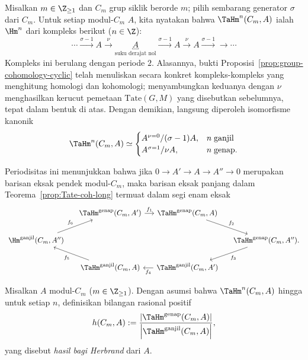 \begin{example}\label{eg:TaHm-periodic}
	Misalkan $m\in\Z_{\geq1}$ dan $C_m$ grup siklik berorde $m$; pilih sembarang
	generator $\sigma$ dari $C_m$. Untuk setiap modul-$C_m$ $A$, kita nyatakan
	bahwa $\TaHm^n(C_m,A)$ ialah $\Hm^n$ dari kompleks berikut
	($n\in\Z$):
	\[ \cdots \xrightarrow{\sigma-1} A \xrightarrow{\nu} \underbracket{A}_{\text{suku derajat nol}} \xrightarrow{\sigma-1} A \xrightarrow{\nu} A \xrightarrow{\sigma-1} \to \cdots \]
	Kompleks ini berulang dengan periode $2$. Alasannya, bukti
	Proposisi~\ref{prop:group-cohomology-cyclic} telah menuliskan secara konkret
	kompleks-kompleks yang menghitung homologi dan kohomologi; menyambungkan
	keduanya dengan $\nu$ menghasilkan kerucut pemetaan
	$\mathrm{Tate}(G,M)$ yang disebutkan sebelumnya, tepat dalam bentuk di
	atas. Dengan demikian, langsung diperoleh isomorfisme kanonik
	\[ \TaHm^n(C_m, A) \simeq \begin{cases}
		A^{\nu=0} / (\sigma-1) A, & n\;\text{ganjil} \\
		A^{\sigma=1} / \nu A, & n\;\text{genap}.
	\end{cases}\]

	Periodisitas ini menunjukkan bahwa jika
	$0\to A'\to A\to A''\to0$ merupakan barisan eksak pendek modul-$C_m$,
	maka barisan eksak panjang dalam Teorema~\ref{prop:Tate-coh-long} termuat
	dalam segi enam eksak
	\begin{equation}\label{eqn:Herbrand-hexagon}
		\begin{tikzcd}[column sep=small]
			& \TaHm^{\text{genap}}(C_m, A') \arrow[r, "f_1"] & \TaHm^{\text{genap}}(C_m, A) \arrow[rd, "f_2"] & \\
			\Hm^{\text{ganjil}}(C_m, A'') \arrow[ru, "f_6"] & & & \TaHm^{\text{genap}}(C_m, A'') \arrow[ld, "f_3"] . \\
			& \TaHm^{\text{ganjil}}(C_m, A) \arrow[lu, "f_5"] & \TaHm^{\text{ganjil}}(C_m, A') \arrow[l, "f_4"] &
		\end{tikzcd}
	\end{equation}
\end{example}

\begin{definition}
	Misalkan $A$ modul-$C_m$ ($m\in\Z_{\geq1}$). Dengan asumsi bahwa
	$\TaHm^n(C_m,A)$ hingga untuk setiap $n$, definisikan bilangan rasional
	positif
	\[ h(C_m, A) := \frac{\left|\TaHm^{\text{genap}}(C_m, A)\right|}{\left|\TaHm^{\text{ganjil}}(C_m, A)\right|}, \]
	yang disebut \emph{hasil bagi Herbrand} dari $A$.
\end{definition}

